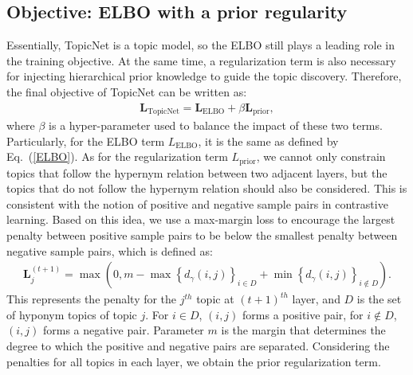 \documentclass{article}
\newcommand{\Lv}[0]{\ensuremath{\boldsymbol{L}} }
\begin{document}
\subsection{Objective: ELBO with a prior regularity}
Essentially, TopicNet is a topic model, so the ELBO still plays a leading role in the training objective. At the same time, a regularization term is also necessary for injecting hierarchical prior knowledge to guide the topic discovery. Therefore, the final objective of TopicNet can be written as:
\begin{align}\label{eq:topicnet}
\Lv _{\text{TopicNet}} = \Lv _{\text{ELBO}} + \beta  \Lv _{\text{prior}},
\end{align}
where $\beta$ is a hyper-parameter used to balance the impact of these two terms. Particularly, for the ELBO term $L _{\text{ELBO}}$, it is the same as defined by Eq.~(\ref{ELBO}). As for the regularization term $L _{\text{prior}}$, we cannot only %
constrain topics that follow the hypernym relation between two adjacent layers, but the topics that do not follow the hypernym relation should also be considered. This is consistent with the notion of positive and negative sample pairs in contrastive learning. Based on this idea, we use a max-margin loss to encourage the largest penalty between positive sample pairs to be below the smallest penalty between negative sample pairs, which is defined as:
\begin{align}\label{eq:rank_loss}
\Lv _{j} ^{(t+1)} = \max(0, m - \max {\left\{ {d_\gamma \left( {i,j} \right)} \right\}_{i \in D}} + \min {\left\{ {d_\gamma \left( {i,j} \right)} \right\}_{i \notin D}}) .
\end{align}
This represents the penalty for the $j^{th}$ topic at ${(t+1)^{th}}$ layer, and $D$ is the set of hyponym topics of topic $j$. For $i \in D$, $(i, j)$ forms a positive pair, for $i \notin D$, $(i, j)$ forms a negative pair. Parameter $m$ is the margin that determines the degree to which the positive and negative pairs are separated. Considering the penalties for all topics in each layer, we obtain the prior regularization term.
\end{document}
